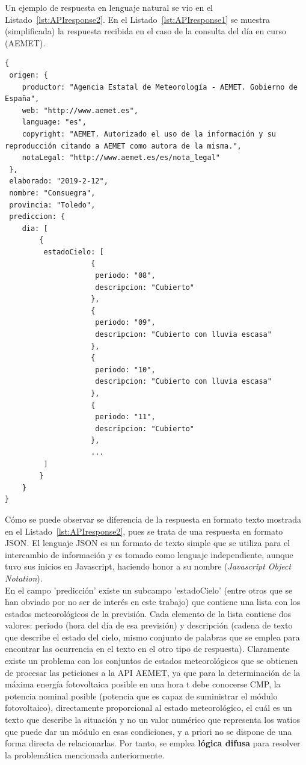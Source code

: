 Un ejemplo de respuesta en lenguaje natural se vio en el Listado~\ref{lst:APIresponse2}. En el Listado~\ref{lst:APIresponse1} se muestra (simplificada) la respuesta recibida en el caso de la consulta del día en curso (\textcopyright AEMET).
\begin{lstlisting}[numbers=none,float=ht,caption={Ejemplo de respuesta de la API-AEMET para el día en curso},label={lst:APIresponse1}]
{
 origen: {
	productor: "Agencia Estatal de Meteorología - AEMET. Gobierno de España",
	web: "http://www.aemet.es",
	language: "es",
	copyright: "AEMET. Autorizado el uso de la información y su reproducción citando a AEMET como autora de la misma.",
	notaLegal: "http://www.aemet.es/es/nota_legal"
 },
 elaborado: "2019-2-12",
 nombre: "Consuegra",
 provincia: "Toledo",
 prediccion: {
 	dia: [
		{
		 estadoCielo: [
					{
					 periodo: "08",
					 descripcion: "Cubierto"
					},
					{
					 periodo: "09",
					 descripcion: "Cubierto con lluvia escasa"
					},
					{
					 periodo: "10",
					 descripcion: "Cubierto con lluvia escasa"
					},
					{
					 periodo: "11",
					 descripcion: "Cubierto"
					},
					...
		 ]
		}
	}
}
\end{lstlisting}
 Cómo se puede observar se diferencia de la respuesta en formato texto mostrada en el Listado~\ref{lst:APIresponse2}, pues se trata de una respuesta en formato \gls{JSON}. El lenguaje \gls{JSON} es un formato de texto simple que se utiliza para el intercambio de información y es tomado como lenguaje independiente, aunque tuvo sus inicios en Javascript, haciendo honor a su nombre (\textit{Javascript Object Notation}).\\En el campo 'predicción' existe un subcampo 'estadoCielo' (entre otros que se han obviado por no ser de interés en este trabajo) que contiene una lista con los estados meteorológicos de la previsión. Cada elemento de la lista contiene dos valores: periodo (hora del día de esa previsión) y descripción (cadena de texto que describe el estado del cielo, mismo conjunto de palabras que se emplea para encontrar las ocurrencia en el texto en el otro tipo de respuesta). Claramente existe un problema con los conjuntos de estados meteorológicos que se obtienen de procesar las peticiones a la \gls{API} \gls{AEMET}, ya que para la determinación de la máxima energía fotovoltaica posible en una hora t debe conocerse \gls{CMP}, la potencia nominal posible (potencia que es capaz de suministrar el módulo fotovoltaico), directamente proporcional al estado meteorológico, el cuál es un texto que describe la situación y no un valor numérico que representa los watios que puede dar un módulo en esas condiciones, y a priori no se dispone de una forma directa de relacionarlas. Por tanto, se emplea \textbf{lógica difusa} para resolver la problemática mencionada anteriormente.
